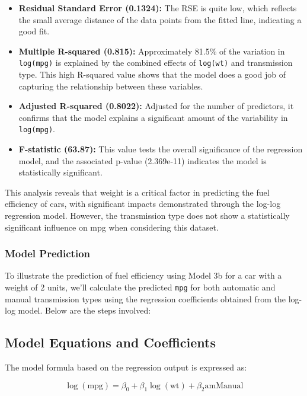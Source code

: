 \documentclass[
  letterpaper,
  DIV=11,
  numbers=noendperiod]{scrreport}
\providecommand{\tightlist}{%
  \setlength{\itemsep}{0pt}\setlength{\parskip}{0pt}}\usepackage{longtable,booktabs,array}
\begin{document}
\begin{itemize}
\tightlist
\item
  \textbf{Residual Standard Error (0.1324):} The RSE is quite low, which
  reflects the small average distance of the data points from the fitted
  line, indicating a good fit.
\item
  \textbf{Multiple R-squared (0.815):} Approximately 81.5\% of the
  variation in \texttt{log(mpg)} is explained by the combined effects of
  \texttt{log(wt)} and transmission type. This high R-squared value
  shows that the model does a good job of capturing the relationship
  between these variables.
\item
  \textbf{Adjusted R-squared (0.8022):} Adjusted for the number of
  predictors, it confirms that the model explains a significant amount
  of the variability in \texttt{log(mpg)}.
\item
  \textbf{F-statistic (63.87):} This value tests the overall
  significance of the regression model, and the associated p-value
  (2.369e-11) indicates the model is statistically significant.
\end{itemize}

This analysis reveals that weight is a critical factor in predicting the
fuel efficiency of cars, with significant impacts demonstrated through
the log-log regression model. However, the transmission type does not
show a statistically significant influence on mpg when considering this
dataset.

\subsubsection{Model Prediction}\label{model-prediction}

To illustrate the prediction of fuel efficiency using Model 3b for a car
with a weight of 2 units, we'll calculate the predicted \texttt{mpg} for
both automatic and manual transmission types using the regression
coefficients obtained from the log-log model. Below are the steps
involved:

\subsection{Model Equations and
Coefficients}\label{model-equations-and-coefficients}

The model formula based on the regression output is expressed as:

\[
\log(\text{mpg}) = \beta_0 + \beta_1\log(\text{wt}) + \beta_2\text{amManual}
\]
\end{document}
